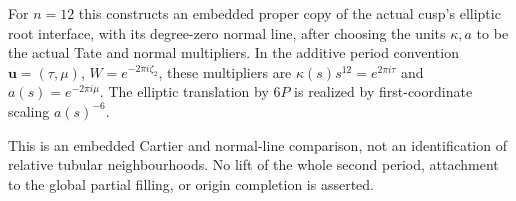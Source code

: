\begin{proposition}
For $n=12$ this constructs an embedded proper copy of
the actual cusp's elliptic root interface, with its
degree-zero normal line, after choosing the units
$\kappa,a$ to be the actual Tate and normal multipliers.
In the additive period convention $\mathbf u=(\tau,\mu)$,
$W=e^{-2\pi i\zeta_2}$, these multipliers are
$\kappa(s)s^{12}=e^{2\pi i\tau}$ and
$a(s)=e^{-2\pi i\mu}$. The elliptic translation by
$6P$ is realized by first-coordinate scaling
$a(s)^{-6}$.

This is an embedded Cartier and normal-line comparison,
not an identification of relative tubular neighbourhoods.
No lift of the whole second period, attachment to the
global partial filling, or origin completion is asserted.
\end{proposition}



